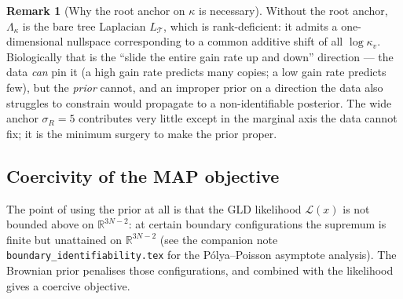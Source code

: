 \documentclass[11pt]{article}
\newcommand{\R}{\mathbb{R}}
\newcommand{\Tree}{\mathcal{T}}
\newcommand{\troot}{R}
\newcommand{\rate}{\kappa}             %
\newcommand{\Ll}{\mathcal{L}}          %
\theoremstyle{definition}
\newtheorem{remark}[theorem]{Remark}
\begin{document}
\begin{remark}[Why the root anchor on $\rate$ is necessary]\label{rem:anchor}
Without the root anchor, $\Lambda_\rate$ is the bare tree Laplacian
$L_\Tree$, which is rank-deficient: it admits a one-dimensional
nullspace corresponding to a common additive shift of all
$\log\rate_v$. Biologically that is the ``slide the entire gain rate
up and down'' direction --- the data \emph{can} pin it (a high gain
rate predicts many copies; a low gain rate predicts few), but the
\emph{prior} cannot, and an improper prior on a direction the data
also struggles to constrain would propagate to a non-identifiable
posterior. The wide anchor $\sigma_\troot = 5$ contributes very
little except in the marginal axis the data cannot fix; it is the
minimum surgery to make the prior proper.
\end{remark}

\subsection{Coercivity of the MAP objective}
\label{sec:coercivity}

The point of using the prior at all is that the GLD likelihood
$\Ll(x)$ is not bounded above on $\R^{3N-2}$: at certain boundary
configurations the supremum is finite but unattained on $\R^{3N-2}$
(see the companion note \texttt{boundary\_identifiability.tex} for
the Pólya--Poisson asymptote analysis). The Brownian prior penalises
those configurations, and combined with the likelihood gives a
coercive objective.
\end{document}
